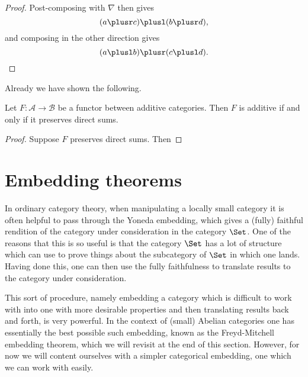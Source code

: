\documentclass[main.tex]{subfiles}
\begin{document}
\begin{proof}
  Post-composing with $\nabla$ then gives
  \begin{equation*}
    (a \plusr c) \plusl (b \plusr d),
  \end{equation*}
  and composing in the other direction gives
  \begin{equation*}
    (a \plusl b) \plusr (c \plusl d).
  \end{equation*}
\end{proof}

Already we have shown the following.

\begin{corollary}
  \label{cor:functor_additive_iff_preserves_direct_sums}
  Let $F\colon \mathcal{A} \to \mathcal{B}$  be a functor between additive categories. Then $F$ is additive if and only if it preserves direct sums.
\end{corollary}
\begin{proof}
  Suppose $F$ preserves direct sums. Then
\end{proof}

\section{Embedding theorems}
\label{sec:embedding_theorems}

In ordinary category theory, when manipulating a locally small category it is often helpful to pass through the Yoneda embedding, which gives a (fully) faithful rendition of the category under consideration in the category $\Set$. One of the reasons that this is so useful is that the category $\Set$ has a lot of structure which can use to prove things about the subcategory of $\Set$ in which one lands. Having done this, one can then use the fully faithfulness to translate results to the category under consideration.

This sort of procedure, namely embedding a category which is difficult to work with into one with more desirable properties and then translating results back and forth, is very powerful. In the context of (small) Abelian categories one has essentially the best possible such embedding, known as the Freyd-Mitchell embedding theorem, which we will revisit at the end of this section. However, for now we will content ourselves with a simpler categorical embedding, one which we can work with easily.
\end{document}

